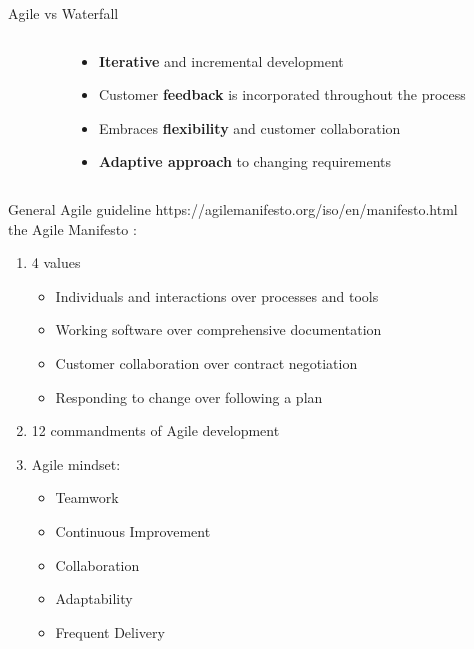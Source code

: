 \documentclass[10pt]{beamer}
\begin{document}
\begin{frame}{Agile vs Waterfall}
  \vspace{2cm}
  \begin{columns}[T]

    \begin{column}{0.5\textwidth}
    \end{column}

    \begin{column}{0.5\textwidth}
      \begin{itemize}
        \item<2-> \textbf{Iterative} and incremental development 
        \item<3-> Customer \textbf{feedback} is incorporated throughout the process
        \item<4-> Embraces \textbf{flexibility} and customer collaboration
        \item<5-> \textbf{Adaptive approach }to changing requirements
      \end{itemize}
    \end{column}

  \end{columns}
\end{frame}

\begin{frame}{General Agile guideline}
    https://agilemanifesto.org/iso/en/manifesto.html \\


    the Agile Manifesto : \\
    \begin{enumerate}
    \item 4 values
    \begin{itemize}
      \item Individuals and interactions over processes and tools 
      \item Working software over comprehensive documentation
      \item Customer collaboration over contract negotiation 
      \item Responding to change over following a plan
    \end{itemize}
    \item 12 commandments of Agile development \\
    \item Agile mindset: 
    \begin{itemize}
      \item Teamwork
      \item Continuous Improvement
      \item Collaboration
      \item Adaptability
      \item Frequent Delivery
    \end{itemize}
    \end{enumerate}

\end{frame}
\end{document}

